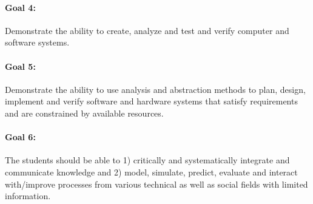 \paragraph{Goal 4:} Demonstrate the ability to create, analyze and
test and verify computer and software systems.


% 
% 
% 
% 
% 

\paragraph{Goal 5:} Demonstrate the ability to use analysis and
abstraction methods to plan, design, implement and verify software and
hardware systems that satisfy requirements and are constrained by
available resources.

% 
% 
% 
% 

\paragraph{Goal 6:} The students should be able to
%
1) critically and systematically integrate and communicate knowledge
and 
%
2) model, simulate, predict, evaluate and interact with/improve
processes from various technical as well as social fields with limited
information.

